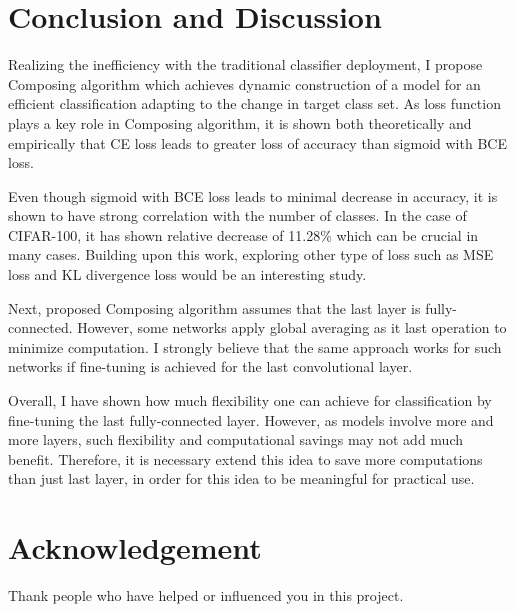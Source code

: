 \documentclass{article}
\begin{document}
\section{Conclusion and Discussion}

Realizing the inefficiency with the traditional classifier deployment, I propose Composing algorithm which achieves dynamic construction of a model for an efficient classification adapting to the change in target class set. As loss function plays a key role in Composing algorithm, it is shown both theoretically and empirically that CE loss leads to greater loss of accuracy than sigmoid with BCE loss.

Even though sigmoid with BCE loss leads to minimal decrease in accuracy, it is shown to have strong correlation with the number of classes. In the case of CIFAR-100, it has shown relative decrease of 11.28\% which can be crucial in many cases. Building upon this work, exploring other type of loss such as MSE loss and KL divergence loss would be an interesting study.

Next, proposed Composing algorithm assumes that the last layer is fully-connected. However, some networks apply global averaging as it last operation to minimize computation. I strongly believe that the same approach works for such networks if fine-tuning is achieved for the last convolutional layer.

Overall, I have shown how much flexibility one can achieve for classification by fine-tuning the last fully-connected layer. However, as models involve more and more layers, such flexibility and computational savings may not add much benefit. Therefore, it is necessary extend this idea to save more computations than just last layer, in order for this idea to be meaningful for practical use.

\newpage

\section*{Acknowledgement}
Thank people who have helped or influenced you in this project.

\nocite{*}



\end{document}

